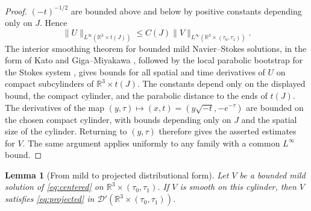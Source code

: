 \documentclass[11pt]{amsart}
\theoremstyle{plain}
\newtheorem{lemma}[theorem]{Lemma}
\theoremstyle{definition}
\theoremstyle{remark}
\numberwithin{equation}{section}
\begin{document}
\begin{proof}
\((-t)^{-1/2}\) are bounded above and below by positive constants depending
only on \(J\).  Hence
\[
   \|U\|_{L^\infty(\mathbb R^3\times t(J))}
   \le
   C(J)\|V\|_{L^\infty(\mathbb R^3\times(\tau_0,\tau_1))}.
\]
The interior smoothing theorem for bounded mild Navier--Stokes solutions,
in the form of Kato \cite{Kato1984} and Giga--Miyakawa
\cite{GigaMiyakawa1985}, followed by the local parabolic bootstrap
for the Stokes system \cite{Ladyzhenskaya1968,Sohr2001}, gives bounds for all
spatial and time derivatives of \(U\) on compact subcylinders of
\(\mathbb R^3\times t(J)\).  The constants depend only on the displayed
bound, the compact cylinder, and the parabolic distance to the ends of
\(t(J)\).  The derivatives of the map
\((y,\tau)\mapsto(x,t)=(y\sqrt{-t},-e^{-\tau})\) are bounded on the chosen
compact cylinder, with bounds depending only on \(J\) and the spatial size of
the cylinder.  Returning to \((y,\tau)\) therefore gives the asserted
estimates for \(V\).  The same argument applies uniformly to any family with
a common \(L^\infty\) bound.
\end{proof}

\begin{lemma}[From mild to projected distributional form]\label{lem:mild-to-projected}
Let \(V\) be a bounded mild solution of \eqref{eq:centered} on
\(\mathbb R^3\times(\tau_0,\tau_1)\).  If \(V\) is smooth on this cylinder,
then \(V\) satisfies \eqref{eq:projected} in
\(\mathcal D'(\mathbb R^3\times(\tau_0,\tau_1))\).
\end{lemma}
\end{document}
